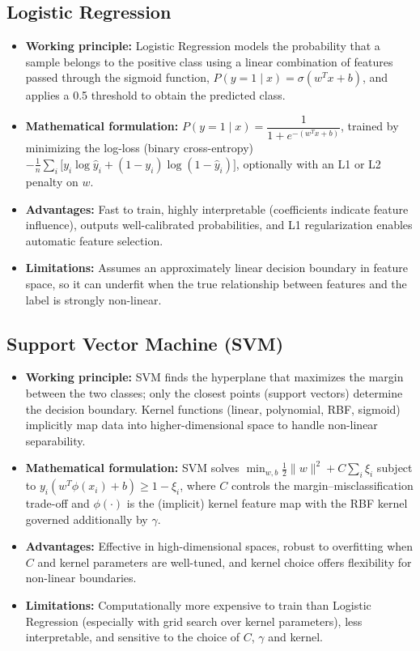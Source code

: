 \documentclass[12pt,a4paper]{article}
\begin{document}
\subsection*{Logistic Regression}
\begin{itemize}
\item \textbf{Working principle:} Logistic Regression models the probability that a sample belongs to the positive class using a linear combination of features passed through the sigmoid function, $P(y=1\mid x) = \sigma(w^Tx+b)$, and applies a 0.5 threshold to obtain the predicted class.
\item \textbf{Mathematical formulation:} $P(y=1\mid x)=\dfrac{1}{1+e^{-(w^Tx+b)}}$, trained by minimizing the log-loss (binary cross-entropy) $-\frac{1}{n}\sum_i \big[y_i\log \hat{y}_i + (1-y_i)\log(1-\hat{y}_i)\big]$, optionally with an L1 or L2 penalty on $w$.
\item \textbf{Advantages:} Fast to train, highly interpretable (coefficients indicate feature influence), outputs well-calibrated probabilities, and L1 regularization enables automatic feature selection.
\item \textbf{Limitations:} Assumes an approximately linear decision boundary in feature space, so it can underfit when the true relationship between features and the label is strongly non-linear.
\end{itemize}

\subsection*{Support Vector Machine (SVM)}
\begin{itemize}
\item \textbf{Working principle:} SVM finds the hyperplane that maximizes the margin between the two classes; only the closest points (support vectors) determine the decision boundary. Kernel functions (linear, polynomial, RBF, sigmoid) implicitly map data into higher-dimensional space to handle non-linear separability.
\item \textbf{Mathematical formulation:} SVM solves $\min_{w,b} \tfrac{1}{2}\lVert w \rVert^2 + C\sum_i \xi_i$ subject to $y_i(w^T\phi(x_i)+b) \geq 1-\xi_i$, where $C$ controls the margin–misclassification trade-off and $\phi(\cdot)$ is the (implicit) kernel feature map with the RBF kernel governed additionally by $\gamma$.
\item \textbf{Advantages:} Effective in high-dimensional spaces, robust to overfitting when $C$ and kernel parameters are well-tuned, and kernel choice offers flexibility for non-linear boundaries.
\item \textbf{Limitations:} Computationally more expensive to train than Logistic Regression (especially with grid search over kernel parameters), less interpretable, and sensitive to the choice of $C$, $\gamma$ and kernel.
\end{itemize}
\end{document}
